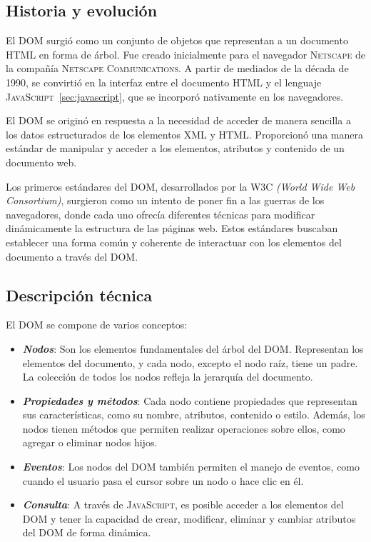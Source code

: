 \documentclass[a4paper, 11pt]{book}
\begin{document}
\subsection{Historia y evolución}
El \textsc{DOM} surgió como un conjunto de objetos que representan a un documento \textsc{HTML} en forma de árbol. Fue creado inicialmente para el navegador \textsc{Netscape} de la compañía \textsc{Netscape Communications}. A partir de mediados de la década de 1990, se convirtió en la interfaz entre el documento \textsc{HTML} y el lenguaje \textsc{JavaScript}~\ref{sec:javascript}, que se incorporó nativamente en los navegadores.

El \textsc{DOM} se originó en respuesta a la necesidad de acceder de manera sencilla a los datos estructurados de los elementos \textsc{XML} y \textsc{HTML}. Proporcionó una manera estándar de manipular y acceder a los elementos, atributos y contenido de un documento web.

Los primeros estándares del \textsc{DOM}, desarrollados por la \textsc{W3C} \emph{(World Wide Web Consortium)}, surgieron como un intento de poner fin a las guerras de los navegadores, donde cada uno ofrecía diferentes técnicas para modificar dinámicamente la estructura de las páginas web. Estos estándares buscaban establecer una forma común y coherente de interactuar con los elementos del documento a través del \textsc{DOM}.
\subsection{Descripción técnica}
El \textsc{DOM} se compone de varios conceptos:
\begin{itemize}
	\item \textbf{\emph{Nodos}}: Son los elementos fundamentales del árbol del \textsc{DOM}. Representan los elementos del documento, y cada nodo, excepto el nodo raíz, tiene un padre. La colección de todos los nodos refleja la jerarquía del documento.
	\item \textbf{\emph{Propiedades y métodos}}: Cada nodo contiene propiedades que representan sus características, como su nombre, atributos, contenido o estilo. Además, los nodos tienen métodos que permiten realizar operaciones sobre ellos, como agregar o eliminar nodos hijos.
	\item \textbf{\emph{Eventos}}: Los nodos del \textsc{DOM} también permiten el manejo de eventos, como cuando el usuario pasa el cursor sobre un nodo o hace clic en él.
	\item \textbf{\emph{Consulta}}: A través de \textsc{JavaScript}, es posible acceder a los elementos del \textsc{DOM} y tener la capacidad de crear, modificar, eliminar y cambiar atributos del \textsc{DOM} de forma dinámica.
\end{itemize}
\end{document}
